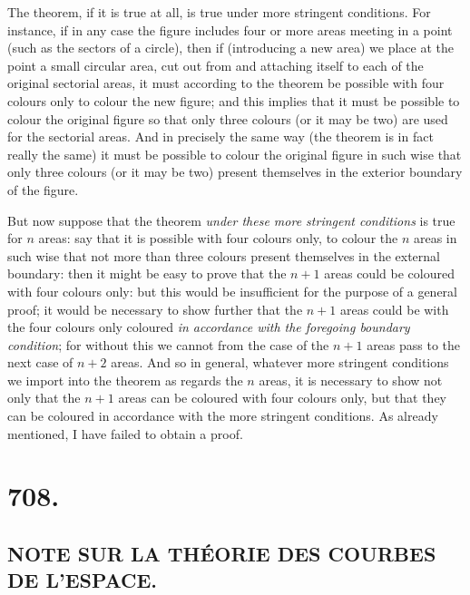 \documentclass[12pt,a4paper,oneside]{book}
\theoremstyle{plain}
\theoremstyle{definition}
\theoremstyle{remark}
\begin{document}
The theorem, if it is true at all, is true under more stringent conditions. For instance, if in any case the figure includes four or more areas meeting in a point (such as the sectors of a circle), then if (introducing a new area) we place at the point a small circular area, cut out from and attaching itself to each of the original sectorial areas, it must according to the theorem be possible with four colours only to colour the new figure; and this implies that it must be possible to colour the original figure so that only three colours (or it may be two) are used for the sectorial areas. And in precisely the same way (the theorem is in fact really the same) it must be possible to colour the original figure in such wise that only three colours (or it may be two) present themselves in the exterior boundary of the figure.

But now suppose that the theorem \textit{under these more stringent conditions} is true for $n$ areas: say that it is possible with four colours only, to colour the $n$ areas in such wise that not more than three colours present themselves in the external boundary: then it might be easy to prove that the $n+1$ areas could be coloured with four colours only: but this would be insufficient for the purpose of a general proof; it would be necessary to show further that the $n+1$ areas could be with the four colours only coloured \textit{in accordance with the foregoing boundary condition}; for without this we cannot from the case of the $n+1$ areas pass to the next case of $n+2$ areas. And so in general, whatever more stringent conditions we import into the theorem as regards the $n$ areas, it is necessary to show not only that the $n+1$ areas can be coloured with four colours only, but that they can be coloured in accordance with the more stringent conditions. As already mentioned, I have failed to obtain a proof.

\cleardoublepage

\section*{708.}
\subsection*{NOTE SUR LA TH\'EORIE DES COURBES DE L'ESPACE.}
\end{document}
